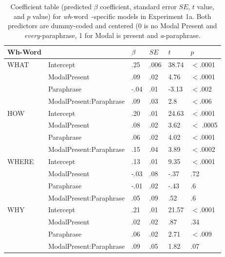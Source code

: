 \documentclass[12pt,letterpaper,table,svgnames,dvipsnames]{article}
\newcommand{\whw}{\emph{wh}-word~}
\begin{document}
\begin{table}[p!]
\begin{center} 
\caption{Coefficient table (predicted $\beta$ coefficient, standard error $SE$, $t$ value, and $p$ value) for \whw-specific models in Experiment 1a. Both predictors are dummy-coded and centered (0 is no Modal Present and \emph{every}-paraphrase, 1 for Modal is present and \emph{a}-paraphrase.} 
\label{sub-model_res_ex1a} 
\begin{tabular}{l|lllll} 
\toprule
Wh-Word & {} & $\beta$ & $SE$ & $t$ & $p$\\
\midrule
WHAT & Intercept & .25 & .006 & 38.74 & $<$.0001\\
{} & ModalPresent & .09 & .02 & 4.76 & $<$.0001\\
{} & Paraphrase & -.04 & .01 & -3.13 & $<$.002\\
{} & ModalPresent:Paraphrase & .09 & .03 & 2.8 & $<$.006\\
\bottomrule
\toprule
HOW & Intercept & .20 & .01 & 24.63 & $<$.0001\\
{} & ModalPresent & .08 & .02 & 3.62 & $<$ .0005\\
{} & Paraphrase & .06 & .02 & 4.02 & $<$.0001\\
{} & ModalPresent:Paraphrase & .15 & .04 & 3.89 & $<$.0002\\
\toprule
WHERE & Intercept & .13 & .01 & 9.35 & $<$.0001\\
{} & ModalPresent & -.03 & .08 & -.37 & .72\\
{} & Paraphrase & -.01 & .02 & -.43 & .6\\
{} & ModalPresent:Paraphrase & .05 & .09 & .52 & .6\\
\bottomrule
\toprule
WHY & Intercept & .21 & .01 & 21.57 & $<$.0001\\
{} & ModalPresent & .02 & .02 & .87 & .34\\
{} & Paraphrase & .06 & .02 & 2.71 & $<$.009\\
{} & ModalPresent:Paraphrase & .09 & .05 & 1.82 & .07\\

\end{tabular}
\end{center}
\end{table}
\end{document}
